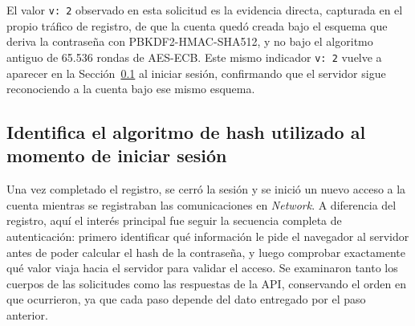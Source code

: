 \documentclass[letter,12pt]{article}
\newcommand{\sangria}{\hspace*{1.25cm}} %
\begin{document}
\begin{itemize}
    El valor \texttt{v: 2} observado en esta solicitud es la evidencia directa, capturada en el propio tráfico de registro, de que la cuenta quedó creada bajo el esquema que deriva la contraseña con PBKDF2-HMAC-SHA512, y no bajo el algoritmo antiguo de 65.536 rondas de AES-ECB. Este mismo indicador \texttt{v: 2} vuelve a aparecer en la Sección~\ref{sec:login} al iniciar sesión, confirmando que el servidor sigue reconociendo a la cuenta bajo ese mismo esquema.
\end{itemize}


\subsection{Identifica el algoritmo de hash utilizado al momento de iniciar sesión}
\label{sec:login}

\sangria Una vez completado el registro, se cerró la sesión y se inició un nuevo acceso a la cuenta mientras se registraban las comunicaciones en \textit{Network}. A diferencia del registro, aquí el interés principal fue seguir la secuencia completa de autenticación: primero identificar qué información le pide el navegador al servidor antes de poder calcular el hash de la contraseña, y luego comprobar exactamente qué valor viaja hacia el servidor para validar el acceso. Se examinaron tanto los cuerpos de las solicitudes como las respuestas de la API, conservando el orden en que ocurrieron, ya que cada paso depende del dato entregado por el paso anterior.
\end{document}

